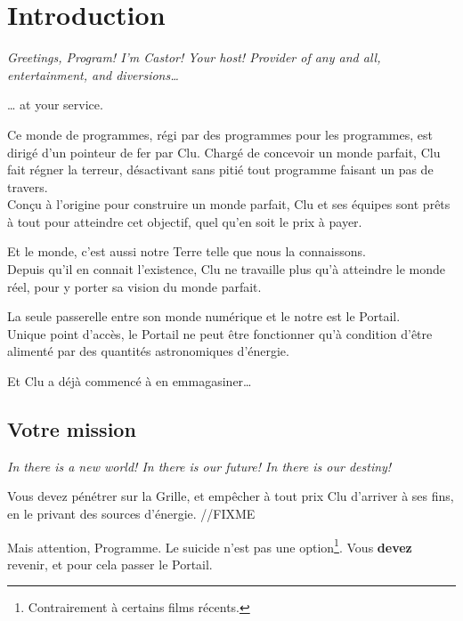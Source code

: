 \newcommand\citationTron[1]{
	
	{\em #1}
}

\section{Introduction}
\citationTron{Greetings, Program! I'm Castor! Your host! Provider of any and
all, entertainment, and diversions…

… at your service.}

Ce monde de programmes, régi par des programmes pour les programmes,
est dirigé d'un pointeur de fer par Clu. Chargé de concevoir un monde
parfait, Clu fait régner la terreur, désactivant sans pitié tout programme
faisant un pas de travers.\\

Conçu à l'origine pour construire un monde parfait, Clu et ses équipes
sont prêts à tout pour atteindre cet objectif, quel qu'en soit le prix
à payer.

Et le monde, c'est aussi notre Terre telle que nous la connaissons.\\

Depuis qu'il en connait l'existence, Clu ne travaille plus qu'à
atteindre le monde réel, pour y porter sa vision du monde parfait.

La seule passerelle entre son monde numérique et le notre est le
Portail.\\

Unique point d'accès, le Portail ne peut être fonctionner qu'à
condition d'être alimenté par des quantités astronomiques d'énergie.

Et Clu a déjà commencé à en emmagasiner\ldots{}\\

        \subsection{Votre mission}

        \emph{In there is a new world! In there is our future! In
          there is our destiny!}

Vous devez pénétrer sur la Grille, et empêcher à tout prix Clu
d'arriver à ses fins, en le privant des sources d'énergie. //FIXME

Mais attention, Programme. Le suicide n'est pas une option\footnote{Contrairement
à certains films récents.}. Vous
\textbf{devez} revenir, et pour cela passer le Portail.

